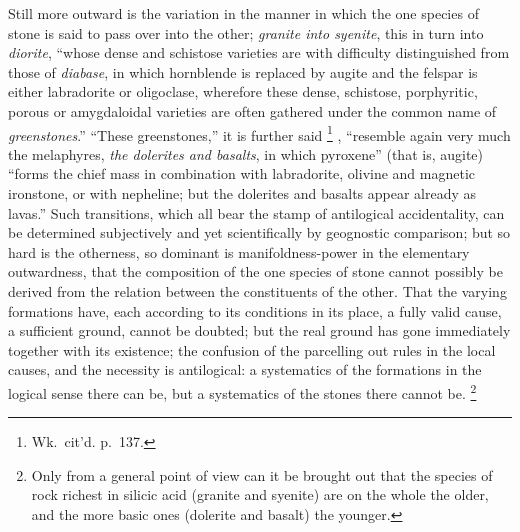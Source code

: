 \documentclass[12pt,a4paper]{book}
\renewcommand{\thefootnote}{*)}
\begin{document}
Still more outward is the variation in the manner in which the one species of stone is said to pass over into the other;
\emph{granite into syenite}, this in turn into \emph{diorite}, ``whose dense and schistose varieties are with difficulty
distinguished from those of \emph{diabase}, in which hornblende is replaced by augite and the felspar is either
labradorite or oligoclase, wherefore these dense, schistose, porphyritic, porous or amygdaloidal varieties are often
gathered under the common name of \emph{greenstones}.'' ``These greenstones,'' it is further said%
\renewcommand{\thefootnote}{***)}%
\footnote{%
Wk.\ cit'd. p.\ 137.}%
\renewcommand{\thefootnote}{*)}%
, ``resemble again very much the melaphyres, \emph{the dolerites and basalts}, in which pyroxene'' (that is, augite)
``forms the chief mass in combination with labradorite, olivine and magnetic ironstone, or with nepheline; but the
dolerites and basalts appear already as lavas.'' Such transitions, which all bear the stamp of antilogical accidentality,
can be determined subjectively and yet scientifically by geognostic comparison; but so hard is the otherness, so
dominant is manifoldness-power in the elementary outwardness, that the composition of the one
species of stone cannot possibly be derived from the relation between the constituents of the other. That the varying
formations have, each according to its conditions in its place, a fully valid cause, a sufficient ground, cannot be
doubted; but the real ground has gone immediately together with its existence; the confusion of the parcelling out rules
in the local causes, and the necessity is antilogical: a systematics of the formations in the logical sense there can be,
but a systematics of the stones there cannot be.%
\footnote{%
Only from a general point of view can it be brought out that the species of rock richest in silicic acid (granite and
syenite) are on the whole the older, and the more basic ones (dolerite and basalt) the younger.}
\end{document}
